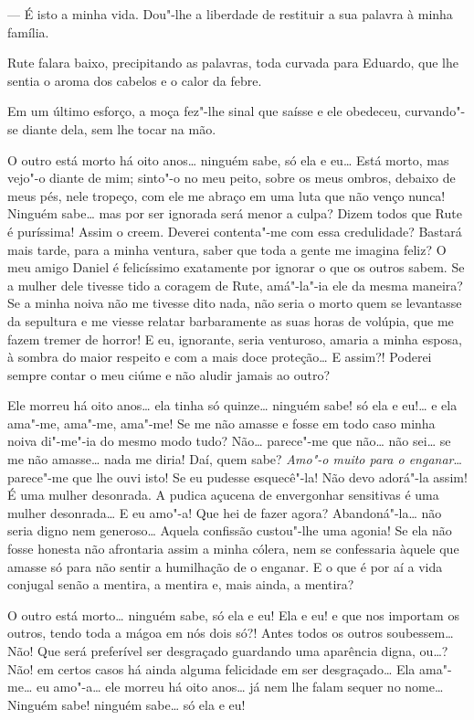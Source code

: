 \asterisc

--- É isto a minha vida. Dou"-lhe a liberdade de restituir a sua palavra
à minha família.

Rute falara baixo, precipitando as palavras, toda curvada para Eduardo,
que lhe sentia o aroma dos cabelos e o calor da febre.

Em um último esforço, a moça fez"-lhe sinal que saísse e ele obedeceu,
curvando"-se diante dela, sem lhe tocar na mão.

\asterisc

O outro está morto há oito anos\ldots{} ninguém sabe, só ela e eu\ldots{} Está
morto, mas vejo"-o diante de mim; sinto"-o no meu peito, sobre os meus
ombros, debaixo de meus pés, nele tropeço, com ele me abraço em uma luta
que não venço nunca! Ninguém sabe\ldots{} mas por ser ignorada será menor a
culpa? Dizem todos que Rute é puríssima! Assim o creem. Deverei
contenta"-me com essa credulidade? Bastará mais tarde, para a minha
ventura, saber que toda a gente me imagina feliz? O meu amigo Daniel é
felicíssimo exatamente por ignorar o que os outros sabem. Se a mulher
dele tivesse tido a coragem de Rute, amá"-la"-ia ele da mesma maneira? Se
a minha noiva não me tivesse dito nada, não seria o morto quem se
levantasse da sepultura e me viesse relatar barbaramente as suas horas
de volúpia, que me fazem tremer de horror! E eu, ignorante, seria
venturoso, amaria a minha esposa, à sombra do maior respeito e com a
mais doce proteção\ldots{} E assim?! Poderei sempre contar o meu ciúme e não
aludir jamais ao outro?

Ele morreu há oito anos\ldots{} ela tinha só quinze\ldots{} ninguém sabe! só ela e
eu!\ldots{} e ela ama"-me, ama"-me, ama"-me! Se me não amasse e fosse em todo
caso minha noiva di"-me"-ia do mesmo modo tudo? Não\ldots{} parece"-me que
não\ldots{} não sei\ldots{} se me não amasse\ldots{} nada me diria! Daí, quem sabe?
\emph{Amo"-o muito para o enganar}\ldots{} parece"-me que lhe ouvi isto! Se eu
pudesse esquecê"-la! Não devo adorá"-la assim! É uma mulher desonrada. A
pudica açucena de envergonhar sensitivas é uma mulher desonrada\ldots{} E eu
amo"-a! Que hei de fazer agora? Abandoná"-la\ldots{} não seria digno nem
generoso\ldots{} Aquela confissão custou"-lhe uma agonia! Se ela não fosse
honesta não afrontaria assim a minha cólera, nem se confessaria àquele
que amasse só para não sentir a humilhação de o enganar. E o que é por
aí a vida conjugal senão a mentira, a mentira e, mais ainda, a mentira?

O outro está morto\ldots{} ninguém sabe, só ela e eu! Ela e eu! e que nos
importam os outros, tendo toda a mágoa em nós dois só?! Antes todos os
outros soubessem\ldots{} Não! Que será preferível ser desgraçado guardando
uma aparência digna, ou\ldots{}? Não! em certos casos há ainda alguma
felicidade em ser desgraçado\ldots{} Ela ama"-me\ldots{} eu amo"-a\ldots{} ele morreu há
oito anos\ldots{} já nem lhe falam sequer no nome\ldots{} Ninguém sabe! ninguém
sabe\ldots{} só ela e eu!

